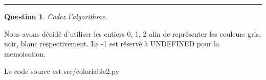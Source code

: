 \documentclass[a4paper,12pt]{article}
\newtheorem{exo}{Question}
\begin{document}
\\\\

\noindent\rule{\textwidth}{1pt}


\begin{exo}
	Codez l'algorithme.
\end{exo}

Nous avons décidé d'utiliser les entiers 0, 1, 2 afin de représenter les couleurs gris, noir, blanc respectivement. Le -1 est réservé à UNDEFINED pour la memoisation.\par
Le code source est src/coloriable2.py\\\\
\end{document}

